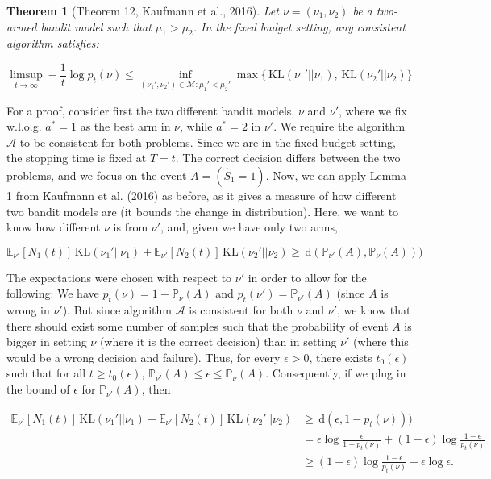 \documentclass[11pt,]{article}
\newtheorem{theorem}{Theorem}
\newcommand{\KL}{\,\text{KL}}
\newcommand{\der}{\,\text{d}}
\begin{document}
\begin{theorem}[Theorem 12, Kaufmann et al., 2016] \label{theorem:KaufmannEtAlTheorem12}
Let $\nu = (\nu_1, \nu_2)$ be a two-armed bandit model such that $\mu_1 > \mu_2$. In the fixed budget setting, any consistent algorithm satisfies:

\begin{equation*}
\limsup_{t \to \infty} - \frac{1}{t} \log p_t(\nu) \leq \inf_{(\nu_1', \nu_2') \in \mathcal{M}: \mu_1' < \mu_2'} \max \big\{\KL(\nu_1' || \nu_1), \KL(\nu_2' || \nu_2)\big\}
\end{equation*}
\end{theorem}

For a proof, consider first the two different bandit models, \(\nu\) and
\(\nu'\), where we fix w.l.o.g. \(a^* = 1\) as the best arm in \(\nu\),
while \(a^* = 2\) in \(\nu'\). We require the algorithm \(\mathcal{A}\)
to be consistent for both problems. Since we are in the fixed budget
setting, the stopping time is fixed at \(T = t\). The correct decision
differs between the two problems, and we focus on the event
\(A = (\hat{S}_1 = 1)\). Now, we can apply Lemma 1 from Kaufmann et al.
(2016) as before, as it gives a measure of how different two bandit
models are (it bounds the change in distribution). Here, we want to know
how different \(\nu\) is from \(\nu'\), and, given we have only two
arms,

\begin{equation*}
\mathbb{E}_{\nu'}[N_1(t)]\KL(\nu_1'|| \nu_1) + \mathbb{E}_{\nu'}[N_2(t)]\KL(\nu_2'|| \nu_2) \geq \der(\mathbb{P}_{\nu'}(A),\mathbb{P}_{\nu}(A)))
\end{equation*}

The expectations were chosen with respect to \(\nu'\) in order to allow
for the following: We have \(p_t(\nu) = 1 - \mathbb{P}_{\nu}(A)\) and
\(p_t(\nu') = \mathbb{P}_{\nu'}(A)\) (since \(A\) is wrong in \(\nu'\)).
But since algorithm \(\mathcal{A}\) is consistent for both \(\nu\) and
\(\nu'\), we know that there should exist some number of samples such
that the probability of event \(A\) is bigger in setting \(\nu\) (where
it is the correct decision) than in setting \(\nu'\) (where this would
be a wrong decision and failure). Thus, for every \(\epsilon > 0\),
there exists \(t_0(\epsilon)\) such that for all
\(t \geq t_0(\epsilon)\),
\(\mathbb{P}_{\nu'}(A) \leq \epsilon \leq \mathbb{P}_\nu(A)\).
Consequently, if we plug in the bound of \(\epsilon\) for
\(\mathbb{P}_{\nu'}(A)\), then

\begin{align*}
\mathbb{E}_{\nu'}[N_1(t)]\KL(\nu_1' || \nu_1) + \mathbb{E}_{\nu'}[N_2(t)]\KL(\nu_2' || \nu_2) & \geq \der(\epsilon,1-p_t(\nu))) \\
& = \epsilon \log \frac{\epsilon}{1-p_t(\nu)} + (1-\epsilon) \log \frac{1-\epsilon}{p_t(\nu)} \\
& \geq (1-\epsilon) \log \frac{1-\epsilon}{p_t(\nu)} + \epsilon \log \epsilon.
\end{align*}
\end{document}
